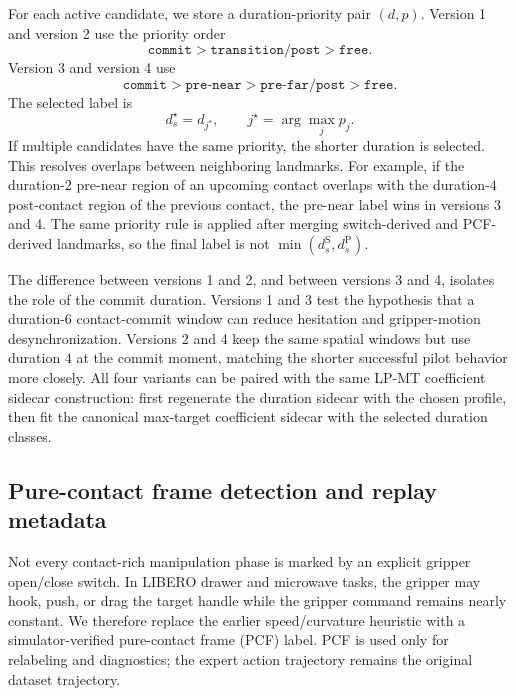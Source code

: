 \documentclass[10pt,twocolumn,letterpaper]{article}
\begin{document}
For each active candidate, we store a duration-priority pair $(d,p)$. Version 1 and version 2 use the priority order
\begin{equation}
    \texttt{commit} > \texttt{transition/post} > \texttt{free}.
\end{equation}
Version 3 and version 4 use
\begin{equation}
    \texttt{commit} > \texttt{pre-near} > \texttt{pre-far/post} > \texttt{free}.
\end{equation}
The selected label is
\begin{equation}
    d_s^{\star}=d_{j^{\star}},
    \qquad
    j^{\star}=\arg\max_j p_j.
\end{equation}
If multiple candidates have the same priority, the shorter duration is selected. This resolves overlaps between neighboring landmarks. For example, if the duration-$2$ pre-near region of an upcoming contact overlaps with the duration-$4$ post-contact region of the previous contact, the pre-near label wins in versions 3 and 4. The same priority rule is applied after merging switch-derived and PCF-derived landmarks, so the final label is not $\min(d_s^{\mathrm{S}},d_s^{\mathrm{P}})$.

The difference between versions 1 and 2, and between versions 3 and 4, isolates the role of the commit duration. Versions 1 and 3 test the hypothesis that a duration-$6$ contact-commit window can reduce hesitation and gripper-motion desynchronization. Versions 2 and 4 keep the same spatial windows but use duration $4$ at the commit moment, matching the shorter successful pilot behavior more closely. All four variants can be paired with the same LP-MT coefficient sidecar construction: first regenerate the duration sidecar with the chosen profile, then fit the canonical max-target coefficient sidecar with the selected duration classes.

\subsection{Pure-contact frame detection and replay metadata}
\label{app:gripper-contact-speed-curv}
Not every contact-rich manipulation phase is marked by an explicit gripper open/close switch. In LIBERO drawer and microwave tasks, the gripper may hook, push, or drag the target handle while the gripper command remains nearly constant. We therefore replace the earlier speed/curvature heuristic with a simulator-verified pure-contact frame (PCF) label. PCF is used only for relabeling and diagnostics; the expert action trajectory remains the original dataset trajectory.
\end{document}
